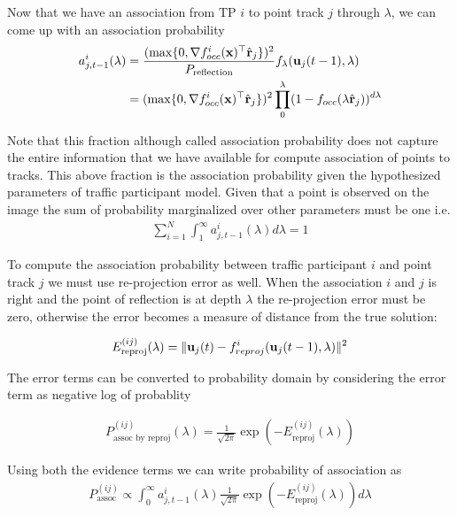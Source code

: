 \documentclass[10pt,twocolumn,letterpaper]{article}
\begin{document}
Now that we have an association from TP $i$ to point track $j$ through
$\lambda$, we can come up with an association probability
\newcommand{\occfxi}{L(\mathbf{x}; \pos{i}{t-1}, \Sigma_i)}
\newcommand{\occfi}{L(\lambda \ray; \pos{i}{t-1}, \Sigma_i)}
\newcommand{\assocP}{a^{i}_{j,t-1}(\lambda)}
\newcommand{\assocPk}{a^{i}_{j,t-1}(\lambda_k)}
\begin{align}
   \assocP &= \frac{(\max \{ 0, \nabla \occf^\top
\ray \})^2 }{P_{\text{reflection}}}\lambdadist\\
&=(\max \{ 0, \nabla \occf^\top \ray \})^2
  \prod_{0}^{\lambda} (1 - f_{occ}(\lambda \ray))^{d\lambda}
\end{align}

Note that this fraction although called association probability does not
capture the entire information that we have available for compute association
of points to tracks. This above fraction is the association probability given 
the hypothesized parameters of traffic participant model. Given that a point is
observed on the image the sum of probability marginalized over other parameters
must be one i.e.
\begin{align}
    \sum_{i = 1}^N
    \int_1^{\infty}
    \assocP d\lambda = 1
\end{align}

To compute the association probability between traffic participant $i$ and
point track $j$ we must use re-projection error as well. When the association
$i$ and $j$ is right and the point of reflection is at depth $\lambda$ the
re-projection error must be zero, otherwise the error becomes a measure of
distance from the true solution:

\newcommand{\Ereproj}{E^{(ij)}_{\text{reproj}}}
\begin{align}
  \Ereproj(\lambda) = \|\trackpj{t} - f^i_{reproj}(\trackpj{t-1}, \lambda)\|^2
\end{align}

The error terms can be converted to probability domain by considering the error
term as negative log of probablity

\begin{align}
  P^{(ij)}_{\text{assoc by reproj}}(\lambda) = \frac{1}{\sqrt{2\pi}}\exp(-\Ereproj(\lambda))
\end{align}

Using both the evidence terms we can write probability of association as
\begin{align}
  P^{(ij)}_{\text{assoc}} \propto \int_0^{\infty} \assocP \frac{1}{\sqrt{2\pi}}\exp(-\Ereproj(\lambda))d\lambda
  \label{eq:prob-assoc}
\end{align}
\end{document}
